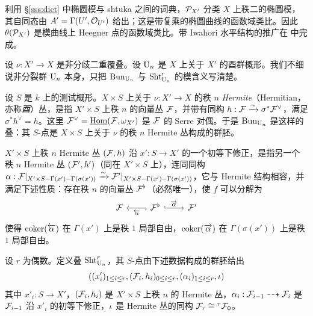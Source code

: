 \begin{exam}
利用 \S\ref{sss:dict} 中椭圆模与 shtuka 之间的词典，$\mathcal{P}_{X'}$ 分类 $X$ 上秩二的椭圆模，其自同态由 $A'=\Gamma(U', \mathcal{O}_{U'})$ 给出；这是带复乘的椭圆曲线的函数域类比。因此 $\theta(\mathcal{P}_{X'})$ 是模曲线上 Heegner 点的函数域类比。带 Iwahori 水平结构的推广在 \cite{YZ2} 中完成。
\end{exam}

\begin{exam}\label{ex:GGP}
设 $\nu: X'\to X$ 是非分歧二重覆叠。设 $\textup{U}_{n}$ 是 $X$ 上关于 $X'$ 的酉群概形。我们不细说非分裂群 $\textup{U}_{n}$ 本身，只把 $\textup{Bun}_{\textup{U}_{n}}$ 与 $\textup{Sht}^{r}_{\textup{U}_{n}}$ 的模含义写清楚。

设 $S$ 是 $k$ 上的测试概形。$X \times S$ 上关于 $\nu:X'\to X$ 的秩 $n$ \emph{Hermite}（Hermitian，亦称\emph{酉}）丛，是指 $X' \times S$ 上秩 $n$ 的向量丛 $\mathcal{F}$，并带有同构 $h : \mathcal{F} \xrightarrow{\sim} \sigma^* \mathcal{F}^{\vee}$，满足 $\sigma^* h^{\vee} = h$。这里 $\mathcal{F}^{\vee}=\underline{\textup{Hom}}(\mathcal{F}, \omega_{X'})$ 是 $\mathcal{F}$ 的 Serre 对偶。于是 $\textup{Bun}_{\textup{U}_{n}}$ 是这样的叠：其 $S$-点是 $X \times S$ 上关于 $\nu$ 的秩 $n$ Hermite 丛构成的群胚。

$X'\times S$ 上秩 $n$ Hermite 丛 $(\mathcal{F},h)$ 沿 $x': S\to X'$ 的一个初等下修正，是指另一个秩 $n$ Hermite 丛 $(\mathcal{F}',h')$（同在 $X'\times S$ 上），连同同构 $\alpha:  \mathcal{F}|_{X' \times S - \Gamma(x') - \Gamma(\sigma(x'))} \xrightarrow{\sim} \mathcal{F}'|_{X' \times S - \Gamma(x')-\Gamma(\sigma(x'))}$，它与 Hermite 结构相容，并满足下述性质：存在秩 $n$ 的向量丛 $\mathcal{F}^{\flat}$（必然唯一），使 $f$ 可以分解为
\begin{equation*}
\begin{tikzcd}
\cF & \cF^{\flat} \arrow[l, hook, "\oll{\a}"] \arrow[r, hook, "\orr{\a}"] & \cF'
\end{tikzcd}
\end{equation*}
使得 $\textup{coker}(\overleftarrow{\alpha})$ 在 $\Gamma(x')$ 上是秩 $1$ 局部自由，$\textup{coker}(\overrightarrow{\alpha})$ 在 $\Gamma(\sigma(x'))$ 上是秩 $1$ 局部自由。

设 $r$ 为偶数。定义叠 $\textup{Sht}_{\textup{U}_{n}}^{r}$，其 $S$-点由下述数据构成的群胚给出
$$((x'_{i})_{1\le i\le r}, (\mathcal{F}_{i}, h_{i})_{0\le i\le r}, (\alpha_{i})_{1\le i\le r}, \iota)$$
其中 $x'_{i}: S\to X'$，$(\mathcal{F}_{i},h_{i})$ 是 $X'\times S$ 上秩 $n$ 的 Hermite 丛，$\alpha_{i}: \mathcal{F}_{i-1}\dashrightarrow\mathcal{F}_{i}$ 是 $\mathcal{F}_{i-1}$ 沿 $x'_{i}$ 的初等下修正，$\iota$ 是 Hermite 丛的同构 $\mathcal{F}_{r}\cong {}^{\tau}\mathcal{F}_{0}$。


\end{exam}
